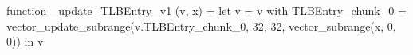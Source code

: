function _update_TLBEntry_v1 (v, x) = let v = { v with TLBEntry_chunk_0 = vector_update_subrange(v.TLBEntry_chunk_0, 32, 32, vector_subrange(x, 0, 0)) } in v

